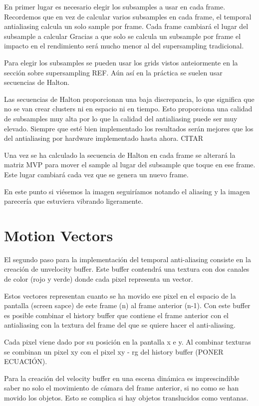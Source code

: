 \documentclass[withindex, glossary]{cam-thesis}
\begin{document}
En primer lugar es necesario elegir los subsamples a usar en cada frame. Recordemos que en vez de calcular varios subsamples en cada frame, el temporal antialiasing calcula un solo sample por frame. Cada frame cambiará el lugar del subsample a calcular Gracias a que solo se calcula un subsample por frame el impacto en el rendimiento será mucho menor al del supersampling tradicional.

Para elegir los subsamples se pueden usar los grids vistos anteiormente en la sección sobre supersampling REF. Aún así en la práctica se suelen usar secuencias de Halton.

Las secuencias de Halton proporcionan una baja discrepancia, lo que significa que no se van crear clusters ni en espacio ni en tiempo. Esto proporciona una calidad de subsamples muy alta por lo que la calidad del antialiasing puede ser muy elevado. Siempre que esté bien implementado los resultados serán mejores que los del antialiasing por hardware implementado hasta ahora. CITAR

Una vez se ha calculado la secuencia de Halton en cada frame se alterará la matriz MVP para mover el sample al lugar del subsample que toque en ese frame. Este lugar cambiará cada vez que se genera un nuevo frame.

En este punto si viésemos la imagen seguiríamos notando el aliasing y la imagen parecería que estuviera vibrando ligeramente.

\section{Motion Vectors}

El segundo paso para la implementación del temporal anti-aliasing consiste en la creación de unvelocity buffer. Este buffer contendrá una textura con dos canales de color (rojo y verde) donde cada pixel representa un vector.

Estos vectores representan cuanto se ha movido ese pixel en el espacio de la pantalla (screen sapce) de este frame (n) al frame anterior (n-1). Con este buffer es posible combinar el history buffer que contiene el frame anterior con el antialiasing con la textura del frame del que se quiere hacer el anti-aliasing.

Cada pixel viene dado por su posición en la pantalla x e y. Al combinar texturas se combinan un pixel xy con el pixel xy - rg del history buffer (PONER ECUACIÓN).

Para la creación del velocity buffer en una escena dinámica es imprescindible saber no solo el movimiento de cámara del frame anterior, si no como se han movido los objetos. Esto se complica si hay objetos translucidos como ventanas.
\end{document}
